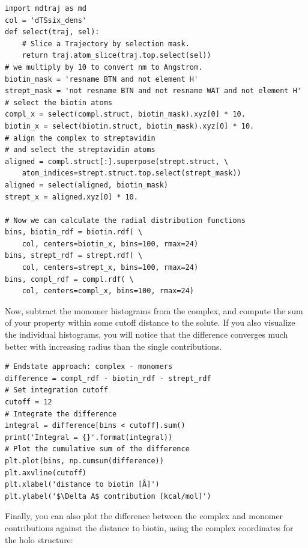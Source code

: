 \documentclass[9pt,tutorial]{livecoms}
\begin{document}
\begin{lstlisting}[style=python]
import mdtraj as md
col = 'dTSsix_dens'
def select(traj, sel):
    # Slice a Trajectory by selection mask.
    return traj.atom_slice(traj.top.select(sel))
# we multiply by 10 to convert nm to Angstrom.
biotin_mask = 'resname BTN and not element H'
strept_mask = 'not resname BTN and not resname WAT and not element H'
# select the biotin atoms
compl_x = select(compl.struct, biotin_mask).xyz[0] * 10.
biotin_x = select(biotin.struct, biotin_mask).xyz[0] * 10.
# align the complex to streptavidin
# and select the streptavidin atoms
aligned = compl.struct[:].superpose(strept.struct, \
    atom_indices=strept.struct.top.select(strept_mask))
aligned = select(aligned, biotin_mask)
strept_x = aligned.xyz[0] * 10.

# Now we can calculate the radial distribution functions
bins, biotin_rdf = biotin.rdf( \
    col, centers=biotin_x, bins=100, rmax=24)
bins, strept_rdf = strept.rdf( \
    col, centers=strept_x, bins=100, rmax=24)
bins, compl_rdf = compl.rdf( \
    col, centers=compl_x, bins=100, rmax=24)
\end{lstlisting}
Now, subtract the monomer histograms from the complex, and compute the sum of your property within some cutoff distance to the solute.
If you also visualize the individual histograms, you will notice that the difference converges much better with increasing radius than the single contributions.

\begin{lstlisting}[style=python]
# Endstate approach: complex - monomers
difference = compl_rdf - biotin_rdf - strept_rdf
# Set integration cutoff
cutoff = 12
# Integrate the difference
integral = difference[bins < cutoff].sum()
print('Integral = {}'.format(integral))
# Plot the cumulative sum of the difference
plt.plot(bins, np.cumsum(difference))
plt.axvline(cutoff)
plt.xlabel('distance to biotin [Å]')
plt.ylabel('$\Delta A$ contribution [kcal/mol]')
\end{lstlisting}
Finally, you can also plot the difference between the complex and monomer contributions against the distance to biotin, using the complex coordinates for the holo structure:
\end{document}
